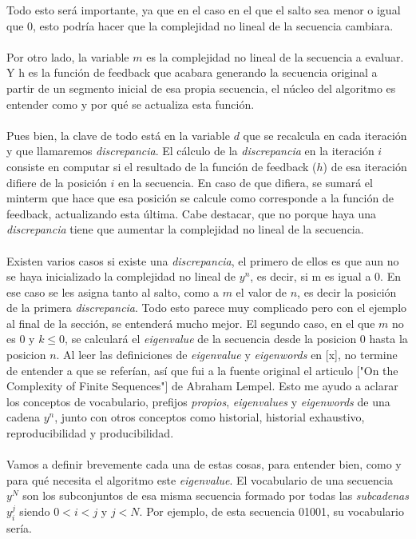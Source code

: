 Todo esto será importante, ya que en el caso en el que el salto sea menor o igual que 0, esto podría hacer que la complejidad no lineal de la secuencia cambiara.\\\\
Por otro lado, la variable $m$ es la complejidad no lineal de la secuencia a evaluar. Y h es la función de feedback que acabara generando la secuencia original a partir de un segmento inicial de esa propia secuencia, el núcleo del algoritmo es entender como y por qué se actualiza esta función.\\\\
Pues bien, la clave de todo está en la variable $d$ que se recalcula en cada iteración y que llamaremos \textit{discrepancia}. El cálculo de la \textit{discrepancia} en la iteración $i$ consiste en computar si el resultado de la función de feedback ($h$) de esa iteración difiere de la posición $i$ en la secuencia. En caso de que difiera, se sumará el minterm que hace que esa posición se calcule como corresponde a la función de feedback, actualizando esta última. Cabe destacar, que no porque haya una \textit{discrepancia} tiene que aumentar la complejidad no lineal de la secuencia.\\\\
Existen varios casos si existe una \textit{discrepancia}, el primero de ellos es que aun no se haya inicializado la complejidad no lineal de $y^{n}$, es decir, si m es igual a 0. En ese caso se les asigna tanto al salto, como a $m$ el valor de $n$, es decir la posición de la primera \textit{discrepancia}. Todo esto parece muy complicado pero con el ejemplo al final de la sección, se entenderá mucho mejor. El segundo caso, en el que $m$ no es 0 y $k \leq 0$, se calculará el \textit{eigenvalue} de la secuencia desde la posicion 0 hasta la posicion $n$. Al leer las definiciones de  \textit{eigenvalue} y \textit{eigenwords} en [x], no termine de entender a que se referían, así que fui a la fuente original el articulo ["On the Complexity of Finite Sequences"] de Abraham Lempel. Esto me ayudo a aclarar los conceptos de vocabulario, prefijos \textit{propios}, \textit{eigenvalues} y \textit{eigenwords} de una cadena $y^n$, junto con otros conceptos como historial, historial exhaustivo, reproducibilidad y producibilidad. \\\\
Vamos a definir brevemente cada una de estas cosas, para entender bien, como y para qué necesita el algoritmo este \textit{eigenvalue}. El vocabulario de una secuencia $y^{N}$ son los subconjuntos de esa misma secuencia formado por todas las \textit{subcadenas} $y_i^{j}$ siendo $0 < i < j$ y $j < N$. Por ejemplo, de esta secuencia 01001, su vocabulario sería.
